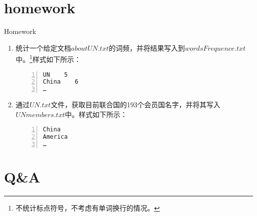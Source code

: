 \documentclass{beamer}
\begin{document}
\section{homework}
\begin{frame}[fragile]{Homework}

\begin{enumerate}
\item
统计一个给定文档$aboutUN.txt$的词频，并将结果写入到$wordsFrequence.txt$中。\footnote{不统计标点符号，不考虑有单词换行的情况。}样式如下所示：
\begin{Verbatim}[numbers=left,frame=single,rulecolor=\color{red}]
UN    5
China    6
…
\end{Verbatim}
\item
通过$UN.txt$文件，获取目前联合国的193个会员国名字，并将其写入$UNmembers.txt$中。样式如下所示：
\begin{Verbatim}[numbers=left,frame=single,rulecolor=\color{red}]
China
America
…
\end{Verbatim}
\end{enumerate}
\end{frame}
\section{Q\&A}
\begin{frame}
\end{frame}


%
\end{document}

